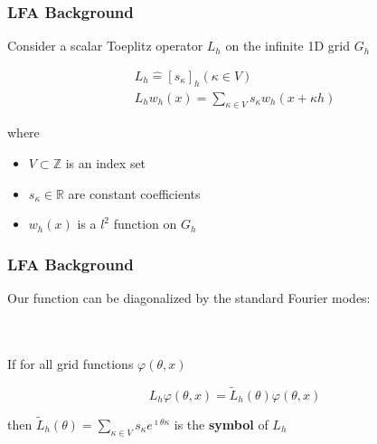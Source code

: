 \documentclass{beamer}
\begin{document}
\begin{frame}
\begin{center}
\frametitle{LFA Background}

Consider a scalar Toeplitz operator $L_h$ on the infinite 1D grid $G_h$

\begin{equation}
\begin{gathered}
L_h \mathrel{\hat{=}} \left[ s_\kappa \right]_h \left( \kappa \in V \right)\\
L_h w_h \left( x \right) = \sum_{\kappa \in V} s_\kappa w_h \left( x + \kappa h \right)
\end{gathered}
\end{equation}

\begin{flushleft}
where
\end{flushleft}

\begin{itemize}

\item $V \subset \mathbb{Z}$ is an index set

\item $s_\kappa \in \mathbb{R}$ are constant coefficients

\item $w_h \left( x \right)$ is a $l^2$ function on $G_h$

\end{itemize}

\end{center}
\end{frame}


\begin{frame}
\begin{center}
\frametitle{LFA Background}

Our function can be diagonalized by the standard Fourier modes:

~\\

~\\

If for all grid functions $\varphi \left( \theta, x \right)$

\vspace{-4mm}

\begin{equation}
L_h \varphi \left( \theta, x \right) = \tilde{L}_h \left( \theta \right) \varphi \left( \theta, x \right)
\end{equation}

then $\tilde{L}_h \left( \theta \right) = \sum_{\kappa \in V} s_\kappa e^{\imath \theta \kappa}$ is the {\bf symbol} of $L_h$\\

\end{center}
\end{frame}
\end{document}

